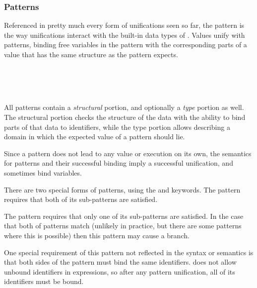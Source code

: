 \subsubsection{Patterns}
\label{sec:patterns}

Referenced in pretty much every form of unifications seen so far, the pattern is
the way unifications interact with the built-in data types of \Trilogy{}. Values
unify with patterns, binding free variables in the pattern with the corresponding
parts of a value that has the same structure as the pattern expects.

\begin{bnf*}
     \\
     \\
     \\
\end{bnf*}

All patterns contain a \emph{structural} portion, and optionally a \emph{type}
portion as well. The structural portion checks the structure of the data with
the ability to bind parts of that data to identifiers, while the type portion
allows describing a domain in which the expected value of a pattern should lie.

Since a pattern does not lead to any value or execution on its own, the semantics for
patterns and their successful binding imply a successful unification, and sometimes
bind variables.

There are two special forms of patterns, using the  and  keywords.
The  pattern requires that both of its sub-patterns are satisfied.

\begin{prooftree}
\end{prooftree}

The  pattern requires that only one of its sub-patterns are satisfied.
In the case that both of patterns match (unlikely in practice, but there are
some patterns where this is possible) then this pattern may cause a branch.

One special requirement of this pattern not reflected in the syntax or
semantics is that both sides of the  pattern must bind the same
identifiers. \Trilogy{} does not allow unbound identifiers in expressions,
so after any pattern unification, all of its identifiers must be bound.

